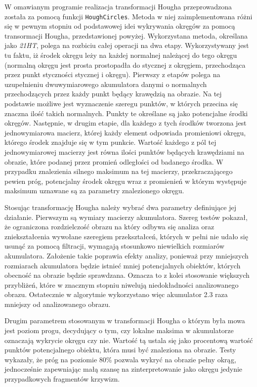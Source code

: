 W omawianym programie realizacja transformacji Hougha przeprowadzona została za pomocą funkcji \texttt{HoughCircles}. Metoda w niej zaimplementowana różni się w pewnym stopniu od podstawowej idei wykrywania okręgów za pomocą transormacji Hougha, przedstawionej powyżej. Wykorzystana metoda, określana jako \textit{21HT}, polega na rozbiciu całej operacji na dwa etapy. Wykorzystywany jest tu faktu, iż środek okręgu leży na każdej normalnej należącej do tego okręgu (normalną okręgu jest prosta prostopadła do stycznej z okręgiem, przechodząca przez punkt styczności stycznej i okręgu). Pierwszy z etapów polega na uzupełnieniu dwuwymiarowego akumulatora danymi o normalnych przechodzących przez każdy punkt będący krawędzią na obrazie. Na tej podstawie możliwe jest wyznaczenie szeregu punktów, w których przecina się znaczna ilość takich normalnych. Punkty te określane są jako potencjalne środki okręgów. Następnie, w drugim etapie, dla każdego z tych środków tworzona jest jednowymiarowa macierz, której każdy element odpowiada promieniowi okręgu, którego środek znajduje się w tym punkcie. Wartość każdego z pól tej jednowymiarowej macierzy jest równa ilości punktów będących krawędziami na obrazie, które podanej przez promień odległości od badanego środka. W przypadku znalezienia silnego maksimum na tej macierzy, przekraczającego pewien próg, potencjalny środek okręgu wraz z promienień w którym występuje maksimum uznawane są za parametry znalezionego okręgu\cite{Yuen}.

Stosując transformację Hougha należy wybrać dwa parametry definiujące jej działanie. Pierwszym są wymiary macierzy akumulatora. Szereg testów pokazał, że ograniczona rozdzielczość obrazu na który odbywa się analiza oraz zniekształcenia wywołane szeregiem przekształceń, których w pełni nie udało się usunąć za pomocą filtracji, wymagają stosunkowo niewielkich rozmiarów akumulatora. Założenie takie poprawia efekty analizy, ponieważ przy mniejszych rozmiarach akumulatora będzie istnieć mniej potencjalnych obiektów, których obecność na obrazie będzie sprawdzana. Oznacza to z kolei stosowanie większych przybliżeń, które w znacznym stopniu niwelują niedokładności analizowanego obrazu. Ostatecznie w algorytmie wykorzystano więc akumulator 2.3 raza mniejszy od analizowanego obrazu.

Drugim parametrem stosowanym w transformacji Hougha o którym była mowa jest poziom progu, decydujący o tym, czy lokalne maksima w akumulatorze oznaczają wykrycie okręgu czy nie. Wartość tą ustala się jako procentową wartość punktów potencjalnego obiektu, która musi być znaleziona na obrazie. Testy wykazały, że próg na poziomie 80\% pozwala wykryć na obrazie pełny okrąg, jednocześnie zapewniając małą szansę na zinterpretowanie jako okręgu jedynie przypadkowych fragmentów krzywizn.

